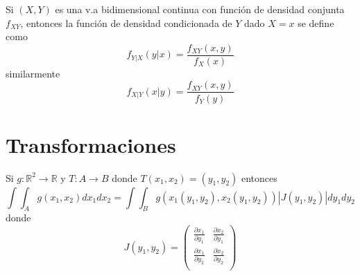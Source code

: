 \begin{defn}
Si $(X,Y)$ es una v.a bidimensional continua con función de densidad conjunta $f_{XY}$, entonces la función de densidad condicionada de $Y$ dado $X=x$ se define como \[ f_{Y|X}(y|x) = \frac{f_{XY}(x,y)}{f_{X}(x)} \] similarmente \[ f_{X|Y}(x|y) = \frac{f_{XY}(x,y)}{f_{Y}(y)} \]
\end{defn}

\begin{ejr}

\end{ejr}

\begin{ejr}

\end{ejr}

\begin{ejr}

\end{ejr}

\begin{ejr}

\end{ejr}

\begin{ejr}

\end{ejr}

\begin{ejr}

\end{ejr}

\begin{ejr}

\end{ejr}

\section{Transformaciones}

\begin{theo}
Si $g:\mathbb{R}^2\rightarrow \mathbb{R}$ y $T:A\rightarrow B$ donde $T(x_1,x_2) = (y_1,y_2)$ entonces \[ \int \int_A g(x_1,x_2)dx_1 dx_2 = \int\int_B g(x_1(y_1,y_2),x_2(y_1,y_2))|J(y_1,y_2)|dy_1 dy_2 \] donde \[ J(y_1,y_2)=
\begin{pmatrix}
\frac{\partial x_1}{\partial y_1}&\frac{\partial x_2}{\partial y_1}\\
\frac{\partial x_1}{\partial y_2}&\frac{\partial x_2}{\partial y_2}\\
\end{pmatrix}
\]
\end{theo}

